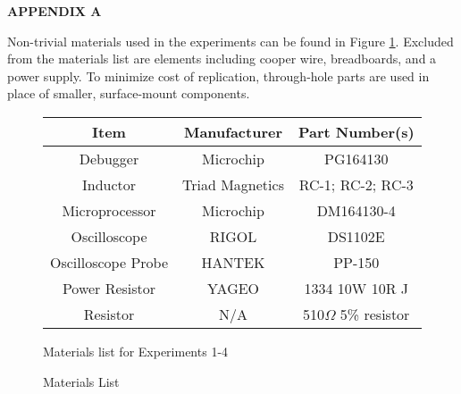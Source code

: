 \centerline{\large\bf APPENDIX A}
\label{appendix:materials}
Non-trivial materials used in the experiments can be found in Figure \ref{fig:Materials}. Excluded from the materials list are elements including cooper wire, breadboards, and a power supply. To minimize cost of replication, through-hole parts are used in place of smaller, surface-mount components.
\begin{figure}[!htbp]
    \centering	
    \bgroup
    \def\arraystretch{1.25}%
    \begin{tabular}{| c | c | c |}
        \hline			
        Item & Manufacturer & Part Number(s)\\ \hline \hline \cline{1-3}
        Debugger & Microchip & PG164130\\ \hline
        Inductor & Triad Magnetics & RC-1; RC-2; RC-3\\ \hline
        Microprocessor & Microchip & DM164130-4\\ \hline
        Oscilloscope & RIGOL & DS1102E\\ \hline
        Oscilloscope Probe & HANTEK & PP-150\\  \hline  
        Power Resistor & YAGEO & 1334 10W 10R J\\  \hline  
        Resistor & N/A & 510$\Omega$ 5\% resistor\\  \hline  
    \end{tabular}
    \egroup
    \caption{Materials List}Materials list for Experiments 1-4
    \label{fig:Materials}
\end{figure}